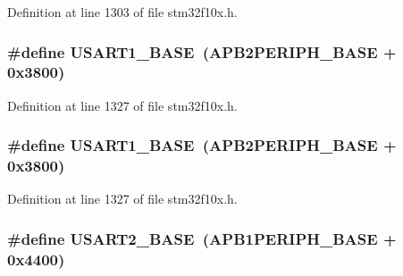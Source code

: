 Definition at line 1303 of file stm32f10x.\+h.

\subsubsection[{\texorpdfstring{U\+S\+A\+R\+T1\+\_\+\+B\+A\+SE}{USART1_BASE}}]{\setlength{\rightskip}{0pt plus 5cm}\#define U\+S\+A\+R\+T1\+\_\+\+B\+A\+SE~({\bf A\+P\+B2\+P\+E\+R\+I\+P\+H\+\_\+\+B\+A\+SE} + 0x3800)}\hypertarget{group___peripheral__memory__map_ga86162ab3f740db9026c1320d46938b4d}{}\label{group___peripheral__memory__map_ga86162ab3f740db9026c1320d46938b4d}


Definition at line 1327 of file stm32f10x.\+h.

\subsubsection[{\texorpdfstring{U\+S\+A\+R\+T1\+\_\+\+B\+A\+SE}{USART1_BASE}}]{\setlength{\rightskip}{0pt plus 5cm}\#define U\+S\+A\+R\+T1\+\_\+\+B\+A\+SE~({\bf A\+P\+B2\+P\+E\+R\+I\+P\+H\+\_\+\+B\+A\+SE} + 0x3800)}\hypertarget{group___peripheral__memory__map_ga86162ab3f740db9026c1320d46938b4d}{}\label{group___peripheral__memory__map_ga86162ab3f740db9026c1320d46938b4d}


Definition at line 1327 of file stm32f10x.\+h.

\subsubsection[{\texorpdfstring{U\+S\+A\+R\+T2\+\_\+\+B\+A\+SE}{USART2_BASE}}]{\setlength{\rightskip}{0pt plus 5cm}\#define U\+S\+A\+R\+T2\+\_\+\+B\+A\+SE~({\bf A\+P\+B1\+P\+E\+R\+I\+P\+H\+\_\+\+B\+A\+SE} + 0x4400)}\hypertarget{group___peripheral__memory__map_gade83162a04bca0b15b39018a8e8ec090}{}\label{group___peripheral__memory__map_gade83162a04bca0b15b39018a8e8ec090}


